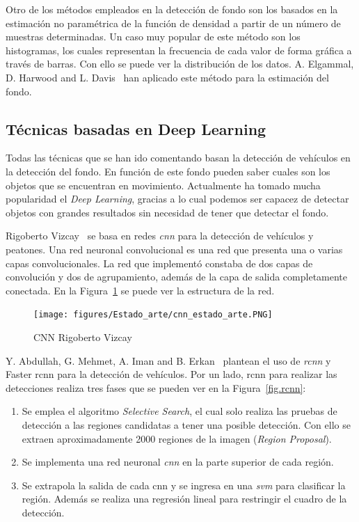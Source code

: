 Otro de los métodos empleados en la detección de fondo son los basados en la estimación no paramétrica de la función de densidad a partir de un número de muestras determinadas. Un caso muy popular de este método son los histogramas, los cuales representan la frecuencia de cada valor de forma gráfica a través de barras. Con ello se puede ver la distribución de los datos. A. Elgammal, D. Harwood and L. Davis~\cite{non_parametric_model} han aplicado este método para la estimación del fondo. 

\subsection{Técnicas basadas en Deep Learning}

Todas las técnicas que se han ido comentando basan la detección de vehículos en la detección del fondo. En función de este fondo pueden saber cuales son los objetos que se encuentran en movimiento. Actualmente ha tomado mucha popularidad el \textit{Deep Learning}, gracias a lo cual podemos ser capacez de detectar objetos con grandes resultados sin necesidad de tener que detectar el fondo. 

Rigoberto Vizcay~\cite{tesis_rigoberto} se basa en redes \textit{\acrfull{cnn}} para la detección de vehículos y peatones. Una red neuronal convolucional es una red que presenta una o varias capas convolucionales. La red que implementó constaba de dos capas de convolución y dos de agrupamiento, además de la capa de salida completamente conectada. En la Figura~\ref{fig.cnn_estado_arte} se puede ver la estructura de la red.

\begin{figure}[H]
  \begin{center}
    \texttt{[image: figures/Estado\_arte/cnn\_estado\_arte.PNG]}
		\caption{CNN Rigoberto Vizcay~\cite{tesis_rigoberto}}
		\label{fig.cnn_estado_arte}
		\end{center}
\end{figure}

Y. Abdullah, G. Mehmet, A. Iman and B. Erkan~\cite{rcnn_detection}  plantean el uso de \textit{\acrfull{rcnn}} y Faster \acrshort{rcnn} para la detección de vehículos. Por un lado, \acrshort{rcnn} para realizar las detecciones realiza tres fases que se pueden ver en la Figura~\ref{fig.rcnn}:
\begin{enumerate}
    \item Se emplea el algoritmo \textit{Selective Search}, el cual solo realiza las pruebas de detección a las regiones candidatas a tener una posible detección. Con ello se extraen aproximadamente 2000 regiones de la imagen (\textit{Region Proposal}).
    \item Se implementa una red neuronal \textit{\acrfull{cnn}} en la parte superior de cada región.
    \item Se extrapola la salida de cada \acrshort{cnn} y se ingresa en una \textit{\acrfull{svm}} para clasificar la región. Además se realiza una regresión lineal para restringir el cuadro de la detección.
\end{enumerate}


